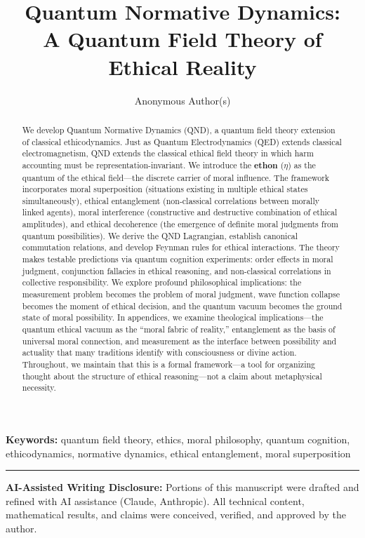 \documentclass[12pt]{article}
\title{Quantum Normative Dynamics:\\A Quantum Field Theory of Ethical Reality}
\author{Anonymous Author(s)}
\date{}
\begin{document}
\maketitle

\noindent\textbf{Keywords:} quantum field theory, ethics, moral philosophy, quantum cognition, ethicodynamics, normative dynamics, ethical entanglement, moral superposition

\begin{abstract}
We develop Quantum Normative Dynamics (QND), a quantum field theory extension of classical ethicodynamics. Just as Quantum Electrodynamics (QED) extends classical electromagnetism, QND extends the classical ethical field theory in which harm accounting must be representation-invariant. We introduce the \textbf{ethon} ($\eta$) as the quantum of the ethical field---the discrete carrier of moral influence. The framework incorporates moral superposition (situations existing in multiple ethical states simultaneously), ethical entanglement (non-classical correlations between morally linked agents), moral interference (constructive and destructive combination of ethical amplitudes), and ethical decoherence (the emergence of definite moral judgments from quantum possibilities). We derive the QND Lagrangian, establish canonical commutation relations, and develop Feynman rules for ethical interactions. The theory makes testable predictions via quantum cognition experiments: order effects in moral judgment, conjunction fallacies in ethical reasoning, and non-classical correlations in collective responsibility. We explore profound philosophical implications: the measurement problem becomes the problem of moral judgment, wave function collapse becomes the moment of ethical decision, and the quantum vacuum becomes the ground state of moral possibility. In appendices, we examine theological implications---the quantum ethical vacuum as the ``moral fabric of reality,'' entanglement as the basis of universal moral connection, and measurement as the interface between possibility and actuality that many traditions identify with consciousness or divine action. Throughout, we maintain that this is a formal framework---a tool for organizing thought about the structure of ethical reasoning---not a claim about metaphysical necessity.
\end{abstract}

\vspace{1em}
\noindent\rule{\linewidth}{0.4pt}
\small
\noindent\textbf{AI-Assisted Writing Disclosure:} Portions of this manuscript were drafted and refined with AI assistance (Claude, Anthropic). All technical content, mathematical results, and claims were conceived, verified, and approved by the author.
\end{document}
